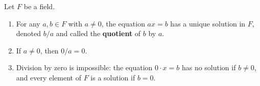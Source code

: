 Let $F$ be a field.

\begin{enumerate}
\item For any $a, b \in F$ with $a \neq 0$, the equation $ax = b$ has a unique solution in $F$, denoted $b/a$ and called the \textbf{quotient} of $b$ by $a$.
\item If $a \neq 0$, then $0/a = 0$.
\item Division by zero is impossible: the equation $0 \cdot x = b$ has no solution if $b \neq 0$, and every element of $F$ is a solution if $b = 0$.
\end{enumerate}
